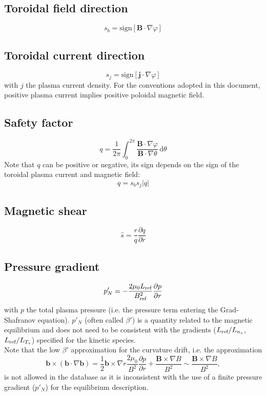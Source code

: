 \documentclass[a4paper]{report}
\begin{document}

\subsection{Toroidal field direction}
$$s_b = \textrm{sign}[\mathbf{B}\cdot\nabla\varphi]$$

\subsection{Toroidal current direction}
$$s_j = \textrm{sign}[\mathbf{j}\cdot\nabla\varphi]$$
with $j$ the plasma current density. For the conventions adopted in this document, positive plasma current implies positive poloidal magnetic field.

\subsection{Safety factor}
$$q=\frac{1}{2\pi}\int_0^{2\pi} \frac{\mathbf{B}\cdot\nabla \varphi}{\mathbf{B}\cdot\nabla \theta}\,\textrm{d}\theta$$
Note that $q$ can be positive or negative, its sign depends on the sign of the toroidal plasma current and magnetic field:
$$q = s_b s_j |q|$$

\subsection{Magnetic shear}
$$\hat{s}=\frac{r}{q}\frac{\partial q}{\partial r}$$


\subsection{Pressure gradient}
$$p'_N = -\frac{2\mu_0 L_{\textrm{ref}}}{B_{\textrm{ref}}^2 }\frac{\partial p}{\partial r}$$
with $p$ the total plasma pressure (i.e. the pressure term entering the Grad-Shafranov equation). $p'_N$ (often called $\beta'$) is a quantity related to the magnetic equilibrium and does not need to be consistent with the gradients ($L_{\textrm{ref}}/L_{n_s}$, $L_{\textrm{ref}}/L_{T_s}$) specified for the kinetic species.\\
Note that the low $\beta'$ approximation for the curvature drift, i.e. the approximation
$$\mathbf{b}\times(\mathbf{b}\cdot\nabla\mathbf{b})=\frac{1}{2}\mathbf{b}\times\nabla r\frac{2\mu_0}{B^2}\frac{\partial p}{\partial r} + \frac{\mathbf{B}\times\nabla B}{B^2} \sim  \frac{\mathbf{B}\times\nabla B}{B^2}, $$
is not allowed in the database as it is inconsistent with the use of a finite pressure gradient ($p'_N$) for the equilibrium description. 
\end{document}
